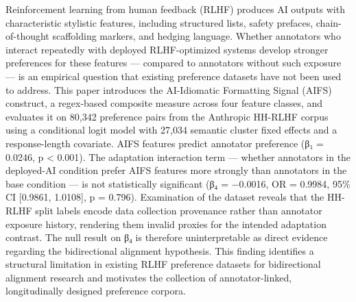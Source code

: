 
Reinforcement learning from human feedback (RLHF) produces AI outputs with characteristic stylistic features, including structured lists, safety prefaces, chain-of-thought scaffolding markers, and hedging language. Whether annotators who interact repeatedly with deployed RLHF-optimized systems develop stronger preferences for these features — compared to annotators without such exposure — is an empirical question that existing preference datasets have not been used to address. This paper introduces the AI-Idiomatic Formatting Signal (AIFS) construct, a regex-based composite measure across four feature classes, and evaluates it on 80,342 preference pairs from the Anthropic HH-RLHF corpus using a conditional logit model with 27,034 semantic cluster fixed effects and a response-length covariate. AIFS features predict annotator preference (β₁ = 0.0246, p < 0.001). The adaptation interaction term — whether annotators in the deployed-AI condition prefer AIFS features more strongly than annotators in the base condition — is not statistically significant (β₄ = −0.0016, OR = 0.9984, 95\% CI [0.9861, 1.0108], p = 0.796). Examination of the dataset reveals that the HH-RLHF split labels encode data collection provenance rather than annotator exposure history, rendering them invalid proxies for the intended adaptation contrast. The null result on β₄ is therefore uninterpretable as direct evidence regarding the bidirectional alignment hypothesis. This finding identifies a structural limitation in existing RLHF preference datasets for bidirectional alignment research and motivates the collection of annotator-linked, longitudinally designed preference corpora.

